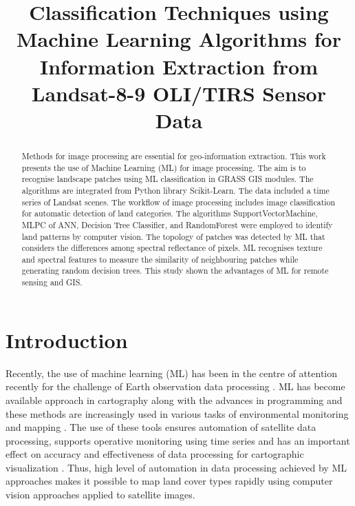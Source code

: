 \documentclass[eprint,
approc,		%
]{actapoly}
\begin{document}
\title[Classification Techniques using Machine Learning Algorithms...]
{Classification Techniques using Machine Learning Algorithms for Information Extraction from Landsat-8-9 OLI/TIRS Sensor Data}



\begin{abstract}
Methods for image processing are essential for geo-information extraction. This work presents the use of Machine Learning (ML) for image processing. The aim is to recognise landscape patches using ML classification in GRASS GIS modules. The algorithms are integrated from Python library Scikit-Learn. The data included a time series of Landsat scenes. The workflow of image processing includes image classification for automatic detection of land categories. The algorithms SupportVectorMachine, MLPC of ANN, Decision Tree Classifier, and RandomForest were employed to identify land patterns by computer vision. The topology of  patches was detected by ML that considers the differences among spectral reflectance of pixels. ML recognises texture and spectral features to measure the similarity of neighbouring patches while generating random decision trees. This study shown the advantages of ML for remote sensing and GIS.
\end{abstract}


\maketitle

\section{Introduction}

Recently, the use of machine learning (ML) has been in the centre of attention recently for the challenge of Earth observation data processing \citep{9395808,10041606,Lemenkova202320,8547145}. ML has become available approach in cartography along with the advances in programming and these methods are increasingly used in various tasks of environmental monitoring and mapping \citep{10142835,jimaging9050098,9850602}. The use of these tools ensures automation of satellite data processing, supports operative monitoring using time series and has an important effect on accuracy and effectiveness of data processing for cartographic visualization \citep{jmse12081279}. Thus, high level of automation in data processing achieved by ML approaches makes it possible to map land cover types rapidly using computer vision approaches applied to satellite images.
\end{document}
